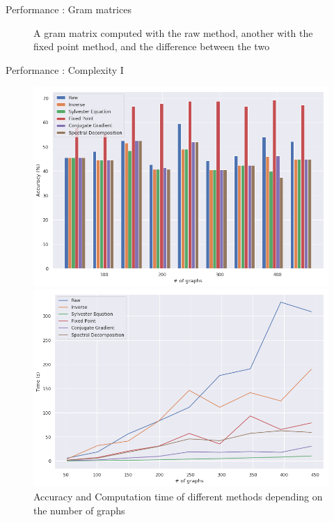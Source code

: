 \documentclass[compress]{beamer}
\begin{document}
\begin{frame}{Performance : Gram matrices}
\begin{figure}[!htb]
\begin{multicols}{3}
	\end{multicols}
	\caption{A gram matrix computed with the raw method, another with the fixed point method, and the difference between the two}
\end{figure}
\end{frame}
\begin{frame}{Performance : Complexity I}
\begin{figure}[!htb]
	\begin{multicols}{2}
		\includegraphics[width=\linewidth]{data/nb_graph/acc.png}\par
		\includegraphics[width=\linewidth]{data/nb_graph/time.png}\par
	\end{multicols}
	\caption {Accuracy and Computation time of different methods depending on the number of graphs}
\end{figure}
\end{frame}
\end{document}
